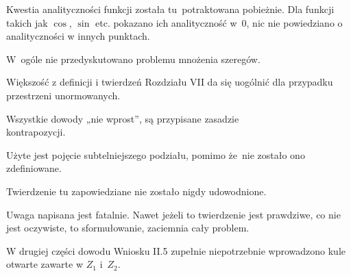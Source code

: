 \documentclass[a4paper,11pt]{article}
\begin{document}
\noindent
Kwestia analityczności funkcji została tu~potraktowana
pobieżnie. Dla funkcji takich jak $\cos$, $\sin$ etc. pokazano ich
analityczność w~0, nic nie powiedziano o analityczności w innych
punktach.

\vspace{\spaceFour}





\noindent
W~ogóle nie przedyskutowano problemu mnożenia szeregów.

\vspace{\spaceFour}





\noindent
Większość z definicji i twierdzeń Rozdziału VII da się uogólnić
dla przypadku przestrzeni unormowanych.

\vspace{\spaceFour}








\noindent
{} Wszystkie dowody „nie wprost”, są przypisane
zasadzie \\
kontrapozycji.

\vspace{\spaceFour}





\noindent
{} Użyte jest pojęcie subtelniejszego podziału, pomimo że~nie zostało
ono zdefiniowane.

\vspace{\spaceFour}





\noindent
{} Twierdzenie tu zapowiedziane nie zostało nigdy udowodnione.

\vspace{\spaceFour}





\noindent
{} Uwaga napisana jest fatalnie. Nawet jeżeli to twierdzenie jest
prawdziwe, co nie jest oczywiste, to sformułowanie, zaciemnia cały problem.

\vspace{\spaceFour}





\noindent
{} W drugiej części dowodu Wniosku II.5 zupełnie niepotrzebnie
wprowadzono kule otwarte zawarte w $Z_{ 1 }$ i~$Z_{ 2 }$.
\end{document}
